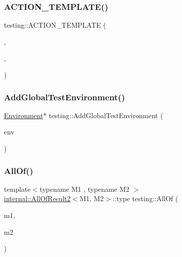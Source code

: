 \mbox{\label{namespacetesting_a3934a47f6125504c939a3573b7fc55c4}} 
\subsubsection{\texorpdfstring{ACTION\_TEMPLATE()}{ACTION\_TEMPLATE()}\hspace{0.1cm}{\footnotesize\ttfamily [28/28]}}
{\footnotesize\ttfamily testing\+::\+A\+C\+T\+I\+O\+N\+\_\+\+T\+E\+M\+P\+L\+A\+TE (\begin{DoxyParamCaption}\item[{Return\+New}]{,  }\item[{H\+A\+S\+\_\+1\+\_\+\+T\+E\+M\+P\+L\+A\+T\+E\+\_\+\+P\+A\+R\+A\+MS(typename, T)}]{,  }\item[{A\+N\+D\+\_\+10\+\_\+\+V\+A\+L\+U\+E\+\_\+\+P\+A\+R\+A\+MS(p0, p1, p2, p3, p4, p5, p6, p7, p8, p9)}]{ }\end{DoxyParamCaption})}

\mbox{\label{namespacetesting_a460d7b998622e332392c1e00be3a60d5}} 
\subsubsection{\texorpdfstring{AddGlobalTestEnvironment()}{AddGlobalTestEnvironment()}}
{\footnotesize\ttfamily \mbox{\hyperlink{classtesting_1_1Environment}{Environment}}$\ast$ testing\+::\+Add\+Global\+Test\+Environment (\begin{DoxyParamCaption}\item[{\mbox{\hyperlink{classtesting_1_1Environment}{Environment}} $\ast$}]{env }\end{DoxyParamCaption})\hspace{0.3cm}{\ttfamily [inline]}}

\mbox{\label{namespacetesting_af7618e8606c1cb45738163688944e2b7}} 
\subsubsection{\texorpdfstring{AllOf()}{AllOf()}\hspace{0.1cm}{\footnotesize\ttfamily [1/9]}}
{\footnotesize\ttfamily template$<$typename M1 , typename M2 $>$ \\
\mbox{\hyperlink{structtesting_1_1internal_1_1AllOfResult2}{internal\+::\+All\+Of\+Result2}}$<$M1, M2$>$\+::type testing\+::\+All\+Of (\begin{DoxyParamCaption}\item[{M1}]{m1,  }\item[{M2}]{m2 }\end{DoxyParamCaption})\hspace{0.3cm}{\ttfamily [inline]}}

